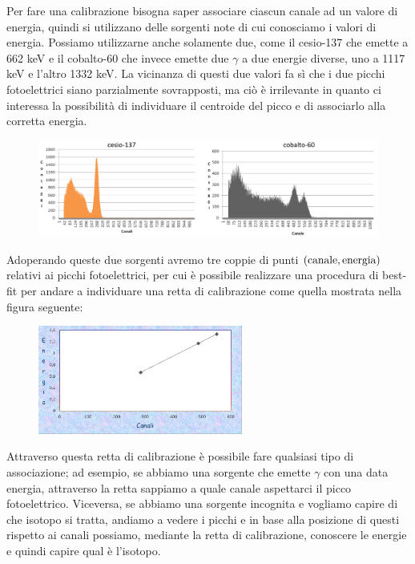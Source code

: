 Per fare una calibrazione bisogna saper associare ciascun canale ad un valore di energia, quindi si utilizzano delle sorgenti note di cui conosciamo i valori di energia. Possiamo utilizzarne anche solamente due, come il cesio-137 che emette a 662 keV e il cobalto-60 che invece emette due $\gamma$ a due energie diverse, uno a 1117 keV e l'altro 1332 keV. La vicinanza di questi due valori fa sì che i due picchi fotoelettrici siano parzialmente sovrapposti, ma ciò è irrilevante in quanto ci interessa la possibilità di individuare il centroide del picco e di associarlo alla corretta energia.
\begin{figure}[H]
   \centering
   \includegraphics[width=\textwidth]{immagini/sorgenti_calibrazione.png}
\end{figure}
Adoperando queste due sorgenti avremo tre coppie di punti $\rm (canale, energia)$ relativi ai picchi fotoelettrici, per cui è possibile realizzare una procedura di best-fit per andare a individuare una retta di calibrazione come quella mostrata nella figura seguente:
\begin{figure}[H]
   \centering
   \includegraphics[width=0.6\textwidth]{immagini/retta_calibrazione_cesio_cobalto.png}
\end{figure}
Attraverso questa retta di calibrazione è possibile fare qualsiasi tipo di associazione; ad esempio, se abbiamo una sorgente che emette $\gamma$ con una data energia, attraverso la retta sappiamo a quale canale aspettarci il picco fotoelettrico. Viceversa, se abbiamo una sorgente incognita e vogliamo capire di che isotopo si tratta, andiamo a vedere i picchi e in base alla posizione di questi rispetto ai canali possiamo, mediante la retta di calibrazione, conoscere le energie e quindi capire qual è l'isotopo.

